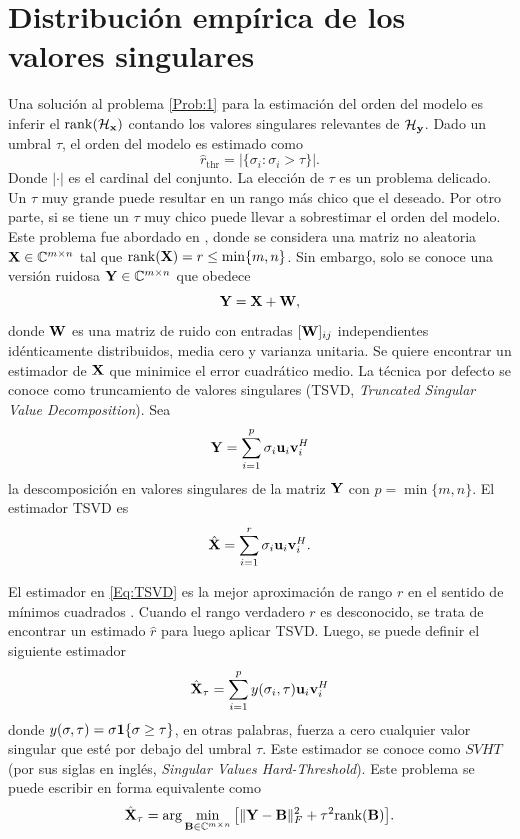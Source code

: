 \section{Distribución empírica de los valores singulares}\label{sec:EDF}
	Una solución al problema \eqref{Prob:1} para la estimación del orden del modelo es inferir el $\mathrm{rank}(\mathcal{H}_{\mathbf{x}})$ contando los valores singulares relevantes de $\mathcal{H}_{\mathbf{y}}$. Dado un umbral $\tau$, el orden del modelo es estimado como
	\begin{equation}
		\hat{r}_{\mathrm{thr}} = \big|\{\sigma_i:\sigma_i>\tau\}\big|.
		\label{Eq:rankThreshold}
	\end{equation}
	Donde $|\cdot|$ es el cardinal del conjunto. La elección de $\tau$ es un problema delicado. Un $\tau$ muy grande  puede resultar en un rango más chico que el deseado. Por otro parte, si se tiene un $\tau$ muy chico puede llevar a sobrestimar el orden del modelo. Este problema fue abordado en \cite{Gavish2014}, donde se considera una matriz no aleatoria $\mathbf{X}\in\mathbb{C}^{m\times n}$ tal que $\mathrm{rank}(\mathbf{X})=r\le\min\{m,n\}$. Sin embargo, solo se conoce una versión ruidosa $\mathbf{Y}\in\mathbb{C}^{m\times n}$ que obedece
	\begin{equation}
		\mathbf{Y} = \mathbf{X} + \mathbf{W},
		\label{Eq:NoisyMatrix}
	\end{equation}
	donde $\mathbf{W}$ es una matriz de ruido con entradas $[\mathbf{W}]_{ij}$ independientes idénticamente distribuidos, media cero y varianza unitaria. Se quiere encontrar un estimador de $\mathbf{X}$ que minimice el error cuadrático medio. La técnica por defecto se conoce como truncamiento de valores singulares (TSVD, \emph{Truncated Singular Value Decomposition}). Sea
	\begin{equation}
		\mathbf{Y} = \sum_{i=1}^{p}\sigma_i\mathbf{u}_i\mathbf{v}_i^H
		\label{Eq:SVDNoisyMatrix}
	\end{equation}
	la descomposición en valores singulares de la matriz $\mathbf{Y}$ con $p=\min\{m,n\}$. El estimador TSVD es
	\begin{equation}
		\hat{\mathbf{X}} = \sum_{i=1}^r \sigma_i\mathbf{u}_i\mathbf{v}_i^H.
		\label{Eq:TSVD}
	\end{equation}
		
	El estimador en \eqref{Eq:TSVD} es la mejor aproximación de rango $r$ en el sentido de mínimos cuadrados \cite{Eckart1936}. Cuando el rango verdadero $r$ es desconocido, se trata de encontrar un estimado $\hat{r}$ para luego aplicar TSVD. Luego, se puede definir el siguiente estimador
	\begin{equation}
		\hat{\mathbf{X}}_{\tau}= \sum_{i=1}^{p}y(\sigma_i,\tau)\mathbf{u}_i\mathbf{v}_i^H
		\label{Eq:HardThreshold}
	\end{equation}
	donde $y(\sigma,\tau) = \sigma\mathbf{1}\{\sigma\ge\tau\}$, en otras palabras, fuerza a cero cualquier valor singular que esté por debajo del umbral $\tau$. Este estimador se conoce como $SVHT$ (por sus siglas en inglés, \emph{Singular Values Hard-Threshold}). Este problema se puede escribir en forma equivalente como
	\begin{equation}
		\hat{\mathbf{X}}_{\tau} = \arg\min_{\mathbf{B}\in\mathbb{C}^{m\times n}} \big[\|\mathbf{Y} - \mathbf{B}\|_F^2 + \tau^2\mathrm{rank}(\mathbf{B})\big].
		\label{Eq:PenalizedProblem}
	\end{equation}
		
